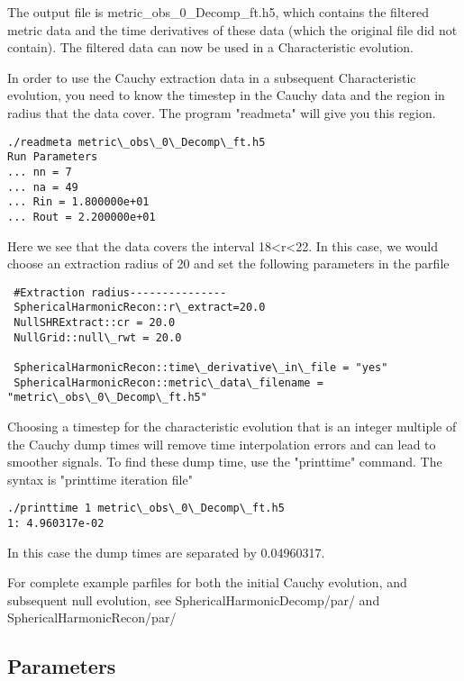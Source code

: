The output file is metric\_obs\_0\_Decomp\_ft.h5, which contains the
filtered metric data and the time derivatives of these data (which the
original file did not contain). The filtered data can now be used in a
Characteristic evolution.

In order to use the Cauchy extraction data in a subsequent Characteristic
evolution, you need to know the timestep in the Cauchy data and
the region in radius that the data cover. The program "readmeta" will
give you this region.

\begin{verbatim}
./readmeta metric\_obs\_0\_Decomp\_ft.h5 
Run Parameters
... nn = 7
... na = 49
... Rin = 1.800000e+01
... Rout = 2.200000e+01
\end{verbatim}

Here we see that the data covers the interval 18<r<22. In this case,
we would choose an extraction radius of 20 and set the following
parameters in the parfile

\begin{verbatim}
 #Extraction radius---------------
 SphericalHarmonicRecon::r\_extract=20.0
 NullSHRExtract::cr = 20.0
 NullGrid::null\_rwt = 20.0

 SphericalHarmonicRecon::time\_derivative\_in\_file = "yes" 
 SphericalHarmonicRecon::metric\_data\_filename = "metric\_obs\_0\_Decomp\_ft.h5"
\end{verbatim}

Choosing a timestep for the characteristic evolution that is an integer
multiple of the Cauchy dump times will remove time interpolation
errors and can lead to smoother signals. To find these dump time,
use the "printtime" command. The syntax is "printtime iteration file"

\begin{verbatim}
./printtime 1 metric\_obs\_0\_Decomp\_ft.h5 
1: 4.960317e-02
\end{verbatim}

In this case the dump times are separated by 0.04960317.

For complete example parfiles for both the initial Cauchy evolution,
and subsequent null evolution, see SphericalHarmonicDecomp/par/
and SphericalHarmonicRecon/par/

\subsection{Parameters}

